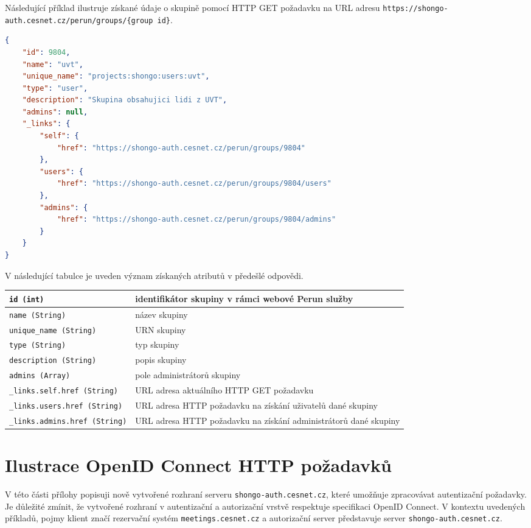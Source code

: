 \documentclass[
  printed, %
  twoside, %
  table,   %
  nolof,     %
  nolot,     %
]{fithesis3}
\begin{document}
Následující příklad ilustruje získané údaje o skupině pomocí HTTP GET požadavku na URL adresu \texttt{https://shongo-auth.cesnet.cz/perun/groups/\{group id\}}.

\begin{lstlisting}[language=json,firstnumber=1]
{
    "id": 9804,
    "name": "uvt",
    "unique_name": "projects:shongo:users:uvt",
    "type": "user",
    "description": "Skupina obsahujici lidi z UVT",
    "admins": null,
    "_links": {
        "self": {
            "href": "https://shongo-auth.cesnet.cz/perun/groups/9804"
        },
        "users": {
            "href": "https://shongo-auth.cesnet.cz/perun/groups/9804/users"
        },
        "admins": {
            "href": "https://shongo-auth.cesnet.cz/perun/groups/9804/admins"
        }
    }
}
\end{lstlisting}

V následující tabulce je uveden význam získaných atributů v předešlé odpovědi. 

\begin{table}[H]
\begin{tabular}{|l|l|}
\hline
\texttt{id (int)}                       & \parbox[t]{6cm}{identifikátor skupiny v rámci webové Perun služby}  \\ \hline
\texttt{name (String)}                  & název skupiny  \\ \hline
\texttt{unique\_name (String)}          & URN skupiny  \\ \hline
\texttt{type (String)}                  &  typ skupiny \\ \hline
\texttt{description (String)}           & popis skupiny  \\ \hline
\texttt{admins (Array)}                 & pole administrátorů skupiny  \\ \hline
\texttt{\_links.self.href (String)}     & \parbox[t]{6cm}{URL adresa aktuálního HTTP GET požadavku}  \\ \hline
\texttt{\_links.users.href (String)}    & \parbox[t]{6cm}{URL adresa HTTP požadavku na získání uživatelů dané skupiny}  \\ \hline
\texttt{\_links.admins.href (String)}   & \parbox[t]{6cm}{URL adresa HTTP požadavku na získání administrátorů dané skupiny}  \\ \hline


\end{tabular}
\end{table}

\chapter{Ilustrace OpenID Connect HTTP požadavků}
\label{oidcEndpoints}
V této části přílohy popisuji nově vytvořené rozhraní serveru \texttt{shongo-auth.cesnet.cz}, které umožňuje zpracovávat autentizační požadavky. Je důležité zmínit, že vytvořené rozhraní v autentizační a autorizační vrstvě respektuje specifikaci OpenID Connect. V kontextu uvedených příkladů, pojmy klient značí rezervační systém \texttt{meetings.cesnet.cz} a autorizační server představuje server \texttt{shongo-auth.cesnet.cz}.
\end{document}
